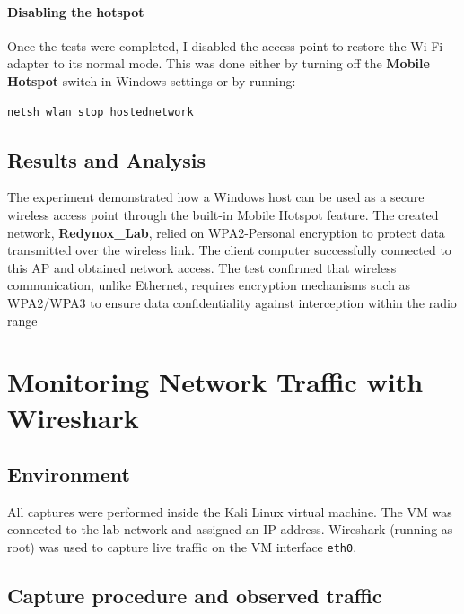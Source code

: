 \documentclass[12pt,a4paper]{report}
\begin{document}
\paragraph{Disabling the hotspot}

Once the tests were completed, I disabled the access point 
to restore the Wi-Fi adapter to its normal mode.  
This was done either by turning off the \textbf{Mobile Hotspot} switch 
in Windows settings or by running:

\begin{lstlisting}[language=bash]
netsh wlan stop hostednetwork
\end{lstlisting}




\subsection{Results and Analysis}

The experiment demonstrated how a Windows host can be used as a secure 
wireless access point through the built-in Mobile Hotspot feature.  
The created network, \textbf{Redynox\_Lab}, relied on WPA2-Personal encryption 
to protect data transmitted over the wireless link.  
The client computer successfully connected to this AP and obtained network access.  
The test confirmed that wireless communication, unlike Ethernet, 
requires encryption mechanisms such as WPA2/WPA3 to ensure data confidentiality 
against interception within the radio range

\newpage

\section{Monitoring Network Traffic with Wireshark}

\subsection{Environment}
All captures were performed inside the Kali Linux virtual machine.  
The VM was connected to the lab network and assigned an IP address.  
Wireshark (running as root) was used to capture live traffic on the VM interface \texttt{eth0}.

\subsection{Capture procedure and observed traffic}
\end{document}
